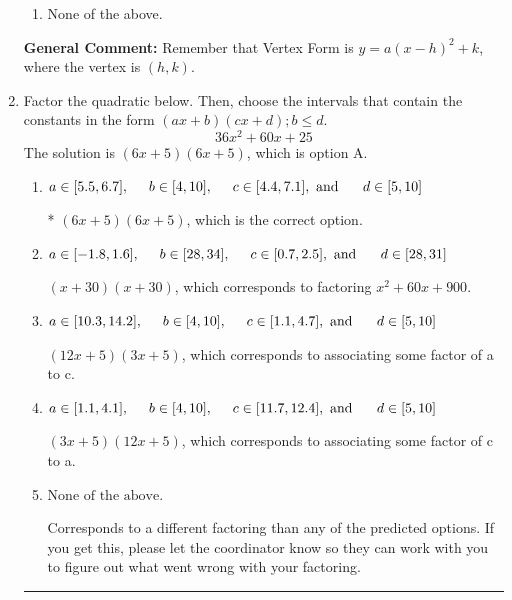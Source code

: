 \documentclass{extbook}[14pt]
\newcommand{\litem}[1]{\item #1

\rule{\textwidth}{0.4pt}}
\begin{document}
\begin{enumerate}
{\begin{enumerate}[label=\Alph*.]
\begin{multicols}{2}
\end{multicols}\item None of the above.\end{enumerate}
\textbf{General Comment:} Remember that Vertex Form is $y = a(x-h)^2+k$, where the vertex is $(h, k)$.
}
\litem{
Factor the quadratic below. Then, choose the intervals that contain the constants in the form $(ax+b)(cx+d); b \leq d.$
\[ 36x^{2} +60 x + 25 \]The solution is \( (6x + 5)(6x + 5) \), which is option A.\begin{enumerate}[label=\Alph*.]
\item \( a \in [5.5, 6.7], \hspace*{5mm} b \in [4, 10], \hspace*{5mm} c \in [4.4, 7.1], \text{ and } \hspace*{5mm} d \in [5, 10] \)

* $(6x + 5)(6x + 5)$, which is the correct option.
\item \( a \in [-1.8, 1.6], \hspace*{5mm} b \in [28, 34], \hspace*{5mm} c \in [0.7, 2.5], \text{ and } \hspace*{5mm} d \in [28, 31] \)

 $(x + 30)(x + 30)$, which corresponds to factoring $x^{2} +60 x + 900$.
\item \( a \in [10.3, 14.2], \hspace*{5mm} b \in [4, 10], \hspace*{5mm} c \in [1.1, 4.7], \text{ and } \hspace*{5mm} d \in [5, 10] \)

 $(12x + 5)(3x + 5)$, which corresponds to associating some factor of a to c.
\item \( a \in [1.1, 4.1], \hspace*{5mm} b \in [4, 10], \hspace*{5mm} c \in [11.7, 12.4], \text{ and } \hspace*{5mm} d \in [5, 10] \)

 $(3x + 5)(12x + 5)$, which corresponds to associating some factor of c to a.
\item \( \text{None of the above.} \)

 Corresponds to a different factoring than any of the predicted options. If you get this, please let the coordinator know so they can work with you to figure out what went wrong with your factoring.
\end{enumerate}

}
\end{enumerate}
\end{document}
